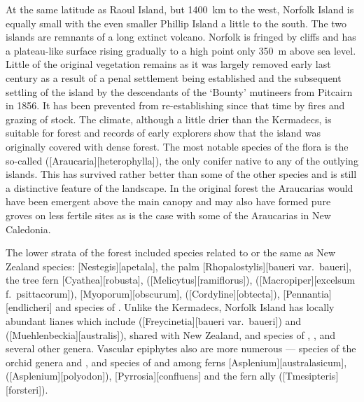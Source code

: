 At the same latitude as Raoul Island, but \SI{1400}{\kilo\metre} to the west, Norfolk Island is equally small with the even smaller Phillip Island a little to the south.
The two islands are remnants of a long extinct volcano.
Norfolk is fringed by cliffs and has a plateau-like surface rising gradually to a high point only \SI{350}{\metre} above sea level.
Little of the original vegetation remains as it was largely removed early last century as a result of a penal settlement being established and the subsequent settling of the island by the descendants of the `Bounty' mutineers from Pitcairn in 1856.
It has been prevented from re-establishing since that time by fires and grazing of stock.
The climate, although a little drier than the Kermadecs, is suitable for forest and records of early explorers show that the island was originally covered with dense forest.
The most notable species of the flora is the so-called  ([Araucaria][heterophylla]), the only conifer native to any of the outlying islands.
This has survived rather better than some of the other species and is still a distinctive feature of the landscape.
In the original forest the Araucarias would have been emergent above the main canopy and may also have formed pure groves on less fertile sites as is the case with some of the Araucarias in New Caledonia.

The lower strata of the forest included species related to or the same as New Zealand species: [Nestegis][apetala], the palm [Rhopalostylis][baueri var.\ baueri], the tree fern [Cyathea][robusta],  ([Melicytus][ramiflorus]),  ([Macropiper][excelsum f.\ psittacorum]), [Myoporum][obscurum],  ([Cordyline][obtecta]), [Pennantia][endlicheri] and species of .
Unlike the Kermadecs, Norfolk Island has locally abundant lianes which include  ([Freycinetia][baueri var.\ baueri]) and  ([Muehlenbeckia][australis]), shared with New Zealand, and species of , ,  and several other genera.
Vascular epiphytes also are more numerous --- species of the orchid genera  and , and species of  and among ferns [Asplenium][australasicum],  ([Asplenium][polyodon]), [Pyrrosia][confluens] and the fern ally  ([Tmesipteris][forsteri]).

